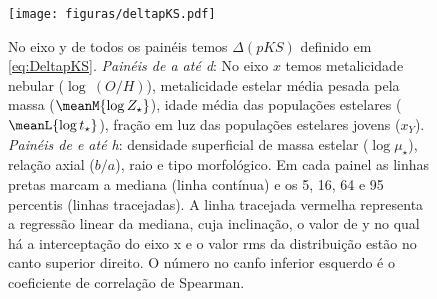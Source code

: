 \begin{figure}
	\centering
	\texttt{[image: figuras/deltapKS.pdf]}
	\caption[Resíduos da {\em pseudo-KS}]
	{No eixo y de todos os painéis temos $\Delta(pKS)$ definido em \eqref{eq:DeltapKS}. \emph{Painéis
de a até d}: No eixo $x$ temos metalicidade nebular ($\log\ (O/H)$), metalicidade estelar média
pesada pela massa ($\meanM{\log Z_\star}$), idade média das populações estelares ($\meanL{\log
t_\star}$), fração em luz das populações estelares jovens ($x_Y$). \emph{Painéis de e até h}:
densidade superficial de massa estelar ($\log \mu_\star$), relação axial ($b/a$), raio e tipo
morfológico. Em cada painel as linhas pretas marcam a mediana (linha contínua) e os 5, 16, 64 e 95
percentis (linhas tracejadas). A linha tracejada vermelha representa a regressão linear da mediana,
cuja inclinação, o valor de y no qual há a interceptação do eixo x e o valor rms da distribuição
estão no canto superior direito. O número no canfo inferior esquerdo é o coeficiente de correlação
de Spearman.}
	\label{fig:deltapKS}
\end{figure}


